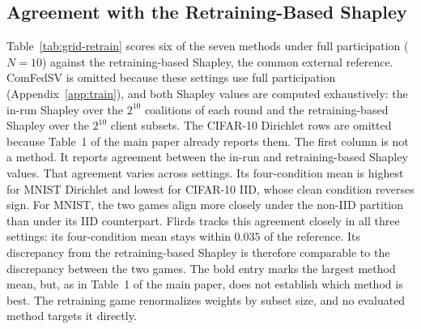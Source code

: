 \documentclass[letterpaper]{article} %
\theoremstyle{definition}
\begin{document}
\subsection{Agreement with the Retraining-Based Shapley}
\label{app:cnn-grid}

Table~\ref{tab:grid-retrain} scores six of the seven methods under full
participation ($N{=}10$) against the retraining-based Shapley, the common
external reference.
ComFedSV is omitted because these settings use full participation
(Appendix~\ref{app:train}), and both Shapley values are computed exhaustively:
the in-run Shapley over the $2^{10}$ coalitions of each round and the
retraining-based Shapley over the $2^{10}$ client subsets. The
CIFAR-10 Dirichlet rows are omitted because
Table~1 of the main paper already
reports them. The first column is not a method. It reports agreement between
the in-run and retraining-based Shapley values. That agreement varies across
settings. Its four-condition mean is highest for MNIST Dirichlet and lowest
for CIFAR-10 IID, whose clean condition reverses sign. For MNIST, the two games
align more closely under the non-IID partition than under its IID counterpart.
Flirds tracks this agreement closely in all three settings: its four-condition
mean stays within $0.035$ of the reference. Its discrepancy from the
retraining-based Shapley is therefore comparable to the discrepancy between
the two games. The bold entry marks the largest method mean, but, as in
Table~1 of the main paper, does not establish which method is best. The
retraining game renormalizes weights by subset size, and no evaluated method
targets it directly.
\end{document}

